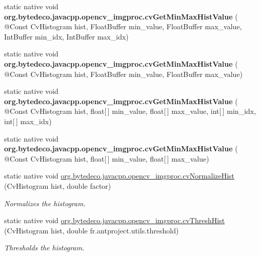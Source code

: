 \begin{DoxyCompactItemize}
\mbox{\label{group__imgproc__c_ga4bb76f75b41f0ef0e9291fb5d23c898b}} 
static native void {\bfseries org.\+bytedeco.\+javacpp.\+opencv\+\_\+imgproc.\+cv\+Get\+Min\+Max\+Hist\+Value} ( @Const Cv\+Histogram hist, Float\+Buffer min\+\_\+value, Float\+Buffer max\+\_\+value, Int\+Buffer min\+\_\+idx, Int\+Buffer max\+\_\+idx)
\item 
\mbox{\label{group__imgproc__c_gad31f6ad74973114c5127c56c3a4e1c79}} 
static native void {\bfseries org.\+bytedeco.\+javacpp.\+opencv\+\_\+imgproc.\+cv\+Get\+Min\+Max\+Hist\+Value} ( @Const Cv\+Histogram hist, Float\+Buffer min\+\_\+value, Float\+Buffer max\+\_\+value)
\item 
\mbox{\label{group__imgproc__c_ga0b588d16fad9889bf7390936ff5c5085}} 
static native void {\bfseries org.\+bytedeco.\+javacpp.\+opencv\+\_\+imgproc.\+cv\+Get\+Min\+Max\+Hist\+Value} ( @Const Cv\+Histogram hist, float\mbox{[}$\,$\mbox{]} min\+\_\+value, float\mbox{[}$\,$\mbox{]} max\+\_\+value, int\mbox{[}$\,$\mbox{]} min\+\_\+idx, int\mbox{[}$\,$\mbox{]} max\+\_\+idx)
\item 
\mbox{\label{group__imgproc__c_gadca9255b36e53fe66c77c2e06f117548}} 
static native void {\bfseries org.\+bytedeco.\+javacpp.\+opencv\+\_\+imgproc.\+cv\+Get\+Min\+Max\+Hist\+Value} ( @Const Cv\+Histogram hist, float\mbox{[}$\,$\mbox{]} min\+\_\+value, float\mbox{[}$\,$\mbox{]} max\+\_\+value)
\item 
static native void \hyperlink{group__imgproc__c_gaae040215ddf5f0582fd04464ea27495f}{org.\+bytedeco.\+javacpp.\+opencv\+\_\+imgproc.\+cv\+Normalize\+Hist} (Cv\+Histogram hist, double factor)
\begin{DoxyCompactList}\small\item\em Normalizes the histogram. \end{DoxyCompactList}\item 
static native void \hyperlink{group__imgproc__c_ga1c1fb991e209c208c788ade579aacc5a}{org.\+bytedeco.\+javacpp.\+opencv\+\_\+imgproc.\+cv\+Thresh\+Hist} (Cv\+Histogram hist, double fr.antproject.utils.threshold)
\begin{DoxyCompactList}\small\item\em Thresholds the histogram. \end{DoxyCompactList}\item 

\end{DoxyCompactItemize}
